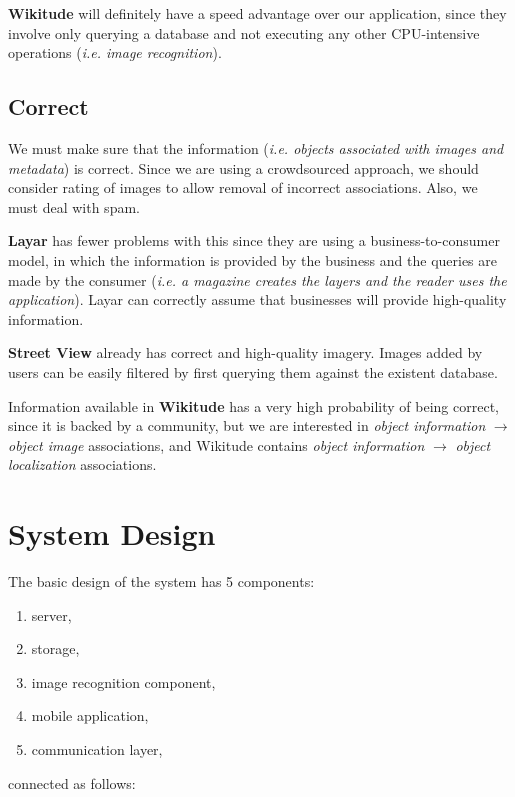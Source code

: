 \documentclass[a4paper,onecolumn,oneside,titlepage,11pt]{report}
\begin{document}
\textbf{Wikitude} will definitely have a speed advantage over our application, since they involve only querying a database and not executing any other CPU-intensive operations (\emph{i.e. image recognition}).

\section*{Correct}
We must make sure that the information (\emph{i.e. objects associated with images and metadata}) is correct. Since we are using a crowdsourced approach, we should consider rating of images to allow removal of incorrect associations. Also, we must deal with spam.

\textbf{Layar} has fewer problems with this since they are using a business-to-consumer model, in which the information is provided by the business and the queries are made by the consumer (\emph{i.e. a magazine creates the layers and the reader uses the application}). Layar can correctly assume that businesses will provide high-quality information.

\textbf{Street View} already has correct and high-quality imagery. Images added by users can be easily filtered by first querying them against the existent database.

Information available in \textbf{Wikitude} has a very high probability of being correct, since it is backed by a community, but we are interested in \emph{object information} $\rightarrow$ \emph{object image} associations, and Wikitude contains \emph{object information} $\rightarrow$ \emph{object localization} associations.

\chapter{System Design}
\label{chap:system-design}
The basic design of the system has 5 components:
\begin{enumerate}
	\item server,
	\item storage,
	\item image recognition component,
	\item mobile application,
	\item communication layer,
\end{enumerate}
connected as follows:
\end{document}
